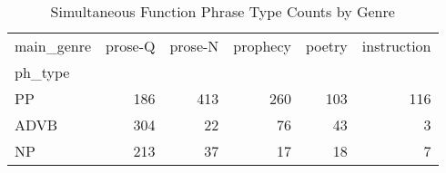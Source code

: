 \begin{table}[htbp!]
\centering
\caption{Simultaneous Function Phrase Type Counts by Genre}
\label{table:simgenph_ct}
\begin{tabular}{lrrrrr}
\toprule
main\_genre &  prose-Q &  prose-N &  prophecy &  poetry &  instruction \\
ph\_type &          &          &           &         &              \\
\midrule
PP      &      186 &      413 &       260 &     103 &          116 \\
ADVB    &      304 &       22 &        76 &      43 &            3 \\
NP      &      213 &       37 &        17 &      18 &            7 \\
\bottomrule
\end{tabular}
\end{table}
